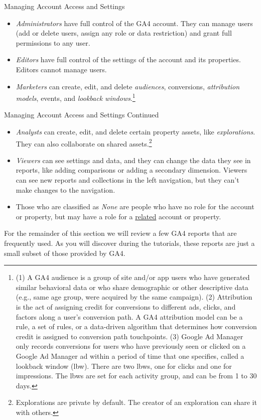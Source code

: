\documentclass[pdf]{beamer}
\theoremstyle{remark}
\theoremstyle{definition}
\begin{document}
\begin{frame}[t]{Managing Account Access and Settings}
\small 
\begin{itemize}
  \item \textit{Administrators} have full control of the GA4 account. They can manage users (add or delete users, assign any role or data restriction) and grant full permissions to any user.
  \item \textit{Editors} have full control of the settings of the account and its properties. Editors cannot manage users.
  \item \textit{Marketers}  can create, edit, and delete \textit{audiences}, conversions, \textit{attribution models}, events, and \textit{lookback windows}.\footnote{(1) A GA4 audience is a group of site and/or app users who have generated similar behavioral data or who share demographic or other descriptive data (e.g., same age group, were acquired by the same campaign). (2) Attribution is the act of assigning credit for conversions to different ads, clicks, and factors along a user's conversion path. A GA4 attribution model can be a rule, a set of rules, or a data-driven algorithm that determines how conversion credit is assigned to conversion path touchpoints. (3) Google Ad Manager only records conversions for users who have previously seen or clicked on a Google Ad Manager ad within a period of time that one specifies, called a lookback window (lbw). There are two lbws, one for clicks and one for impressions. The lbws are set for each activity group, and can be from 1 to 30 days.}
\end{itemize}
\end{frame}

\begin{frame}[t]{Managing Account Access and Settings Continued}
\small
\begin{itemize}
  \item \textit{Analysts} can create, edit, and delete certain property assets, like \textit{explorations}. They can also collaborate on shared assets.\footnote{Explorations are private by default. The creator of an exploration can share it with others.} 
  \item  \textit{Viewers} can see settings and data, and they can change the data they see in reports, like adding comparisons or adding a secondary dimension. Viewers can see new reports and collections in the left navigation, but they can't make changes to the navigation.
  \item Those who are classified as \textit{None} are people who have no role for the account or property, but may have a role for a \underline{related} account or property.
\end{itemize}
For the remainder of this section we will review a few GA4 reports that are frequently used.  As you will discover during the tutorials, these reports are just a small subset of those provided by GA4.
\end{frame}
\end{document}
